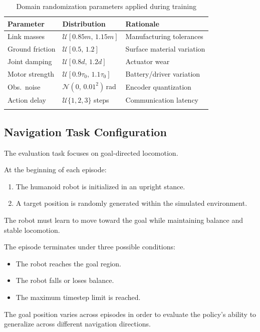 \documentclass[pdflatex,sn-mathphys-num]{sn-jnl}%
\theoremstyle{thmstyleone}%
\theoremstyle{thmstyletwo}%
\theoremstyle{thmstylethree}%
\begin{document}
\begin{table}[ht]
\caption{Domain randomization parameters applied during training}\label{tab:domrand}%
\begin{tabular}{@{}lll@{}}
\toprule
Parameter & Distribution & Rationale \\
\midrule
Link masses      & $\mathcal{U}[0.85m,\,1.15m]$          & Manufacturing tolerances \\
Ground friction  & $\mathcal{U}[0.5,\,1.2]$               & Surface material variation \\
Joint damping    & $\mathcal{U}[0.8d,\,1.2d]$             & Actuator wear \\
Motor strength   & $\mathcal{U}[0.9\tau_0,\,1.1\tau_0]$   & Battery/driver variation \\
Obs.\ noise      & $\mathcal{N}(0,\,0.01^2)$\,rad          & Encoder quantization \\
Action delay     & $\mathcal{U}\{1,2,3\}$ steps            & Communication latency \\
\botrule
\end{tabular}
\end{table}

\subsection{Navigation Task Configuration}
The evaluation task focuses on goal-directed locomotion.

At the beginning of each episode:
\begin{enumerate}
    \item The humanoid robot is initialized in an upright stance.
    \item A target position is randomly generated within the simulated environment.
\end{enumerate}

The robot must learn to move toward the goal while maintaining balance and stable locomotion.

The episode terminates under three possible conditions:
\begin{itemize}
    \item The robot reaches the goal region.
    \item The robot falls or loses balance.
    \item The maximum timestep limit is reached.
\end{itemize}    

The goal position varies across episodes in order to evaluate the policy's ability to generalize across different navigation directions.
\end{document}
